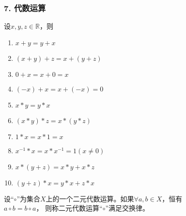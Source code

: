 \documentclass{beamer}
\begin{document}
\begin{CJK*}{UTF8}{gbsn}
\begin{frame}
  \frametitle{7. 代数运算}
  \begin{minipage}[t]{0.49\linewidth}
  \begin{block}{}
    设$x, y, z \in \mathbb{R}$，则
   \begin{enumerate}
   \item   $x + y = y + x$
   \item   $(x + y) + z = x + (y + z)$
   \item   $0 + x = x + 0 = x$
   \item   $(-x) + x = x + (-x) = 0$
   \item   $x * y = y * x$
   \item   $(x * y) * z = x * (y *z)$
   \item   $1 * x = x * 1 = x$
   \item   $x^{-1} * x = x * x^{-1} = 1(x\neq 0)$
   \item   $x* (y + z) = x * y + x * z$
   \item   $(y + z) * x = y * x + z * x$
    \end{enumerate}
  \end{block}\pause
\end{minipage}
\begin{minipage}[t]{0.49\linewidth}
  \begin{Def}
    设“$\circ$”为集合$X$上的一个二元代数运算。如果$\forall a, b \in X$，恒有\\$a \circ b = b \circ a$， 则称二元代数运算“$\circ$”满足\alert{交换律}。
  \end{Def}
\end{minipage}
\end{frame}


\end{CJK*}
\end{document}
